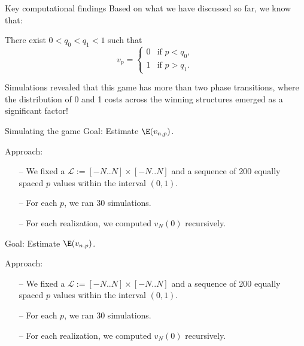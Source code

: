 \documentclass[11pt, mathserif]{beamer}
\begin{document}
    \begin{frame}{Key computational findings}
        \pause
        Based on what we have discussed so far, we know that:\\
        \vspace{0.1cm}

        There exist $0 < q_0 < q_1 < 1$ such that
        \[
            v_p  =  \begin{cases}
                        0 & \text{if } p < q_0, \\
                        1 & \text{if } p > q_1.
                    \end{cases}
        \]

        \vspace{0.5cm}
        \pause
        \textcolor{blendedblue}{Simulations revealed that this game has more than two phase transitions, where the distribution of 0 and 1 costs across the winning structures emerged as a significant factor!}
    \end{frame}

    \begin{frame}{Simulating the game}
        \textcolor{blendedblue}{Goal}: Estimate $\E(v_{n, p})$.
        \vspace{0.3cm}

        Approach: 
        \begin{itemize}
            \item[--] We fixed a $\mathcal{L} := [-N..N] \times [-N..N]$ and a sequence of 200 equally spaced $p$ values within the interval $(0, 1)$. 
            \item[--] For each $p$, we ran 30 simulations.
            \item[--] For each realization, we computed $v_N(0)$ recursively.  
        \end{itemize}

        
    \end{frame}

    \begin{frame}
        \textcolor{blendedblue}{Goal}: Estimate $\E(v_{n, p})$.
        \vspace{0.3cm}

        Approach: 
        \begin{itemize}
            \item[--] We fixed a $\mathcal{L} := [-N..N] \times [-N..N]$ and a sequence of 200 equally spaced $p$ values within the interval $(0, 1)$. 
            \item[--] For each $p$, we ran 30 simulations.
            \item[--] For each realization, we computed $v_N(0)$ recursively.  
        \end{itemize}

        
    \end{frame}
\end{document}
